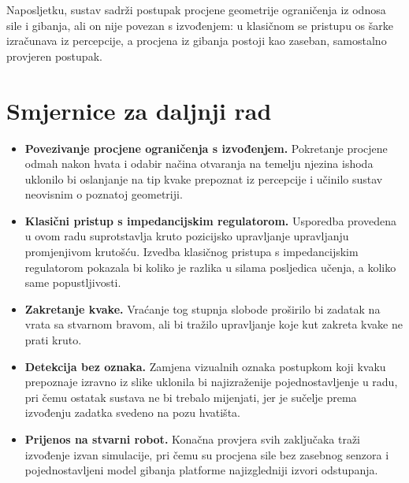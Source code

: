 Naposljetku, sustav sadrži postupak procjene geometrije ograničenja iz odnosa sile i gibanja, ali
on nije povezan s izvođenjem: u klasičnom se pristupu os šarke izračunava iz percepcije, a
procjena iz gibanja postoji kao zaseban, samostalno provjeren postupak.

\section{Smjernice za daljnji rad}

\begin{itemize}
      \item \textbf{Povezivanje procjene ograničenja s izvođenjem.} Pokretanje procjene odmah
            nakon hvata i odabir načina otvaranja na temelju njezina ishoda uklonilo bi oslanjanje
            na tip kvake prepoznat iz percepcije i učinilo sustav neovisnim o poznatoj geometriji.

      \item \textbf{Klasični pristup s impedancijskim regulatorom.} Usporedba provedena u ovom radu
            suprotstavlja kruto pozicijsko upravljanje upravljanju promjenjivom krutošću. Izvedba
            klasičnog pristupa s impedancijskim regulatorom pokazala bi koliko je razlika u silama
            posljedica učenja, a koliko same popustljivosti.

      \item \textbf{Zakretanje kvake.} Vraćanje tog stupnja slobode proširilo bi zadatak na vrata
            sa stvarnom bravom, ali bi tražilo upravljanje koje kut zakreta kvake ne prati kruto.

      \item \textbf{Detekcija bez oznaka.} Zamjena vizualnih oznaka postupkom koji kvaku
            prepoznaje izravno iz slike uklonila bi najizraženije pojednostavljenje u radu, pri
            čemu ostatak sustava ne bi trebalo mijenjati, jer je sučelje prema izvođenju zadatka
            svedeno na pozu hvatišta.

      \item \textbf{Prijenos na stvarni robot.} Konačna provjera svih zaključaka traži izvođenje
            izvan simulacije, pri čemu su procjena sile bez zasebnog senzora i pojednostavljeni
            model gibanja platforme najizgledniji izvori odstupanja.
\end{itemize}